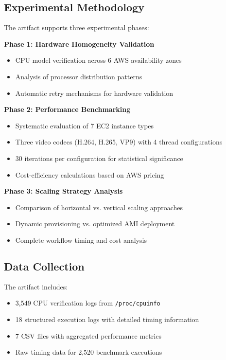 \documentclass[conference]{IEEEtran}
\begin{document}
\subsection{Experimental Methodology}

The artifact supports three experimental phases:

\textbf{Phase 1: Hardware Homogeneity Validation}
\begin{itemize}
	\item CPU model verification across 6 AWS availability zones
	\item Analysis of processor distribution patterns
	\item Automatic retry mechanisms for hardware validation
\end{itemize}

\textbf{Phase 2: Performance Benchmarking}
\begin{itemize}
	\item Systematic evaluation of 7 EC2 instance types
	\item Three video codecs (H.264, H.265, VP9) with 4 thread configurations
	\item 30 iterations per configuration for statistical significance
	\item Cost-efficiency calculations based on AWS pricing
\end{itemize}

\textbf{Phase 3: Scaling Strategy Analysis}
\begin{itemize}
	\item Comparison of horizontal vs. vertical scaling approaches
	\item Dynamic provisioning vs. optimized AMI deployment
	\item Complete workflow timing and cost analysis
\end{itemize}

\subsection{Data Collection}

The artifact includes:

\begin{itemize}
	\item 3,549 CPU verification logs from \texttt{/proc/cpuinfo}
	\item 18 structured execution logs with detailed timing information
	\item 7 CSV files with aggregated performance metrics
	\item Raw timing data for 2,520 benchmark executions
\end{itemize}
\end{document}
